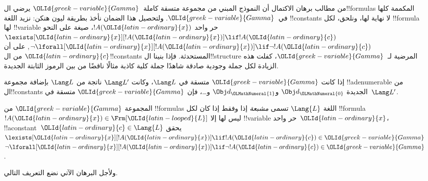 \documentclass[../../../include/open-logic-section]{subfiles}
\begin{document}


\begin{explain}
من مطالب برهان الاكتمال أن النموذج المبني من مجموعة متسقة
كاملة~$\OLId{greek-variable}{Gamma}$ يرضي ال!!{formula}s المكممة كلها في~$\OLId{greek-variable}{Gamma}$.
ولتحصيل هذا الضمان نأخذ بطريقة ليون هنكن: نزيد اللغة
!!{constant}s لا نهاية لها، ونلحق، لكل !!{formula} لها
!!{variable} حر واحد $!A(\OLId{latin-ordinary}{x})$، صيغة على النحو
      {$\lexists[\OLId{latin-ordinary}{x}][!A(\OLId{latin-ordinary}{x})] \lif !A(\OLId{latin-ordinary}{c})$}
      {$\lnot\lforall[\OLId{latin-ordinary}{x}][!A(\OLId{latin-ordinary}{x})] \lif \lnot !A(\OLId{latin-ordinary}{c})$},
على أن $\OLId{latin-ordinary}{c}$ من ال!!{constant}s المستحدثة. فإذا بنينا ال!!{structure}
المرضية لـ~$\OLId{greek-variable}{Gamma}$، كفلت هذه الزيادة لكل
{جملة وجودية صادقة شاهدًا}
{جملة كلية كاذبة مثالًا ناقضًا}
من بين الرموز الثابتة الجديدة.
\end{explain}

\begin{prop}
إذا كانت $\OLId{greek-variable}{Gamma}$ متسقة في $\Lang L$، وكانت $\Lang L'$ ناتجة من
$\Lang L$ بإضافة مجموعة !!a{denumerable} من ال!!{constant}s الجديدة
$\Obj d_\OLMathNumeral{0}$ و$\Obj d_\OLMathNumeral{1}$ و\dots، فإن $\OLId{greek-variable}{Gamma}$ متسقة في~$\Lang L'$.
\end{prop}

\begin{defn}
المجموعة $\OLId{greek-variable}{Gamma}$ من !!{formula}s اللغة $\Lang {L}$ تسمى
\emph{مشبعة} إذا وفقط إذا كان لكل !!{formula}~$!A(\OLId{latin-ordinary}{x}) \in \Frm[\OLId{latin-looped}{L}]$
ليس لها إلا !!{variable} حر واحد~$\OLId{latin-ordinary}{x}$، !!a{constant}~$\OLId{latin-ordinary}{c} \in \Lang{L}$ يحقق
      {$\lexists[\OLId{latin-ordinary}{x}][!A(\OLId{latin-ordinary}{x})] \lif !A(\OLId{latin-ordinary}{c}) \in \OLId{greek-variable}{Gamma}$}
      {$\lnot\lforall[\OLId{latin-ordinary}{x}][!A(\OLId{latin-ordinary}{x})] \lif \lnot !A(\OLId{latin-ordinary}{c}) \in \OLId{greek-variable}{Gamma}$}.
\end{defn}

ولأجل البرهان الآتي نضع التعريف التالي.
\end{document}
